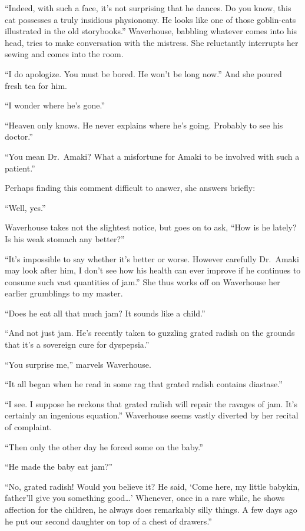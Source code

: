 \documentclass{book}
\begin{document}
``Indeed, with such a face, it's not surprising that he dances. Do you
know, this cat possesses a truly insidious physionomy. He looks like one
of those goblin-cats illustrated in the old storybooks.'' Waverhouse,
babbling whatever comes into his head, tries to make conversation with
the mistress. She reluctantly interrupts her sewing and comes into the
room.

``I do apologize. You must be bored. He won't be long now.'' And she
poured fresh tea for him.

``I wonder where he's gone.''

``Heaven only knows. He never explains where he's going. Probably to see
his doctor.''

``You mean Dr.~Amaki? What a misfortune for Amaki to be involved with
such a patient.''

Perhaps finding this comment difficult to answer, she answers briefly:

``Well, yes.''

Waverhouse takes not the slightest notice, but goes on to ask, ``How is
he lately? Is his weak stomach any better?''

``It's impossible to say whether it's better or worse. However carefully
Dr.~Amaki may look after him, I don't see how his health can ever
improve if he continues to consume such vast quantities of jam.'' She
thus works off on Waverhouse her earlier grumblings to my master.

``Does he eat all that much jam? It sounds like a child.''

``And not just jam. He's recently taken to guzzling grated radish on the
grounds that it's a sovereign cure for dyspepsia.''

``You surprise me,'' marvels Waverhouse.

``It all began when he read in some rag that grated radish contains
diastase.''

``I see. I suppose he reckons that grated radish will repair the ravages
of jam. It's certainly an ingenious equation.'' Waverhouse seems vastly
diverted by her recital of complaint.

``Then only the other day he forced some on the baby.''

``He made the baby eat jam?''

``No, grated radish! Would you believe it? He said, `Come here, my
little babykin, father'll give you something good\ldots{}' Whenever,
once in a rare while, he shows affection for the children, he always
does remarkably silly things. A few days ago he put our second daughter
on top of a chest of drawers.''
\end{document}
